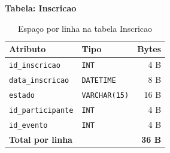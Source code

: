 \documentclass[runningheads]{llncs}
\begin{document}
                \vspace{0.4cm}
                \noindent\begin{minipage}{\textwidth}
                \noindent\textbf{Tabela: Inscricao}\\[0.2cm]

                \begin{table}[H]
                \centering
                \renewcommand{\arraystretch}{1.3}
                \begin{tabular}{|l|l|r|}
                \hline
                \textbf{Atributo} & \textbf{Tipo} & \textbf{Bytes} \\ \hline
                \texttt{id\_inscricao}    & \texttt{INT}          & 4 B \\ \hline
                \texttt{data\_inscricao}  & \texttt{DATETIME}     & 8 B \\ \hline
                \texttt{estado}           & \texttt{VARCHAR(15)}  & 16 B \\ \hline
                \texttt{id\_participante} & \texttt{INT}          & 4 B \\ \hline
                \texttt{id\_evento}       & \texttt{INT}          & 4 B \\ \hline
                \textbf{Total por linha}  & & \textbf{36 B} \\ \hline
                \end{tabular}
                \vspace{0.2cm}
                \caption{Espaço por linha na tabela Inscricao} \label{tab:bytes_inscricao}
                \end{table}
                \end{minipage}
\end{document}
